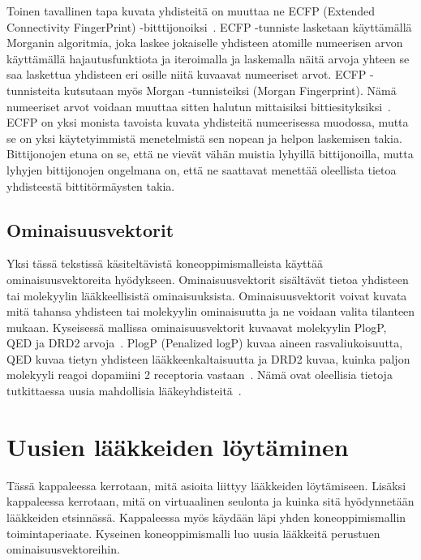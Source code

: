 \documentclass[finnish,twoside,censored,tkt,sw-line]{HYthesisML}
\begin{document}
Toinen tavallinen tapa kuvata yhdisteitä on muuttaa ne ECFP (Extended Connectivity FingerPrint) -bitttijonoiksi~\cite{RogersDavid2010EF}.
ECFP -tunniste lasketaan käyttämällä Morganin algoritmia, joka laskee jokaiselle yhdisteen atomille numeerisen arvon käyttämällä hajautusfunktiota ja iteroimalla ja laskemalla näitä arvoja yhteen se saa laskettua yhdisteen eri osille niitä kuvaavat numeeriset arvot.
ECFP -tunnisteita kutsutaan myös Morgan -tunnisteiksi (Morgan Fingerprint).
Nämä numeeriset arvot voidaan muuttaa sitten halutun mittaisiksi bittiesityksiksi~\cite{RogersDavid2010EF}.
ECFP on yksi monista tavoista kuvata yhdisteitä numeerisessa muodossa, mutta se on yksi käytetyimmistä menetelmistä sen nopean ja helpon laskemisen takia.
Bittijonojen etuna on se, että ne vievät vähän muistia lyhyillä bittijonoilla, mutta lyhyjen bittijonojen ongelmana on, että ne saattavat menettää oleellista tietoa yhdisteestä bittitörmäysten takia.

\section{Ominaisuusvektorit}

Yksi tässä tekstissä käsiteltävistä koneoppimismalleista käyttää ominaisuusvektoreita hyödykseen.
Ominaisuusvektorit sisältävät tietoa yhdisteen tai molekyylin lääkkeellisistä ominaisuuksista.
Ominaisuusvektorit voivat kuvata mitä tahansa yhdisteen tai molekyylin ominaisuutta ja ne voidaan valita tilanteen mukaan.
Kyseisessä mallissa ominaisuusvektorit kuvaavat molekyylin PlogP, QED ja DRD2 arvoja~\cite{ShinBonggun}.
PlogP (Penalized logP) kuvaa aineen rasvaliukoisuutta, QED kuvaa tietyn yhdisteen lääkkeenkaltaisuutta ja DRD2 kuvaa, kuinka paljon molekyyli reagoi dopamiini 2 receptoria vastaan~\cite{BickertonGRichard2012Qtcb}.
Nämä ovat oleellisia tietoja tutkittaessa uusia mahdollisia lääkeyhdisteitä~\cite{ShinBonggun}.

\chapter{Uusien lääkkeiden löytäminen}

Tässä kappaleessa kerrotaan, mitä asioita liittyy lääkkeiden löytämiseen.
Lisäksi kappaleessa kerrotaan, mitä on virtuaalinen seulonta ja kuinka sitä hyödynnetään lääkkeiden etsinnässä.
Kappaleessa myös käydään läpi yhden koneoppimismallin toimintaperiaate.
Kyseinen koneoppimismalli luo uusia lääkkeitä perustuen ominaisuusvektoreihin.
\end{document}
